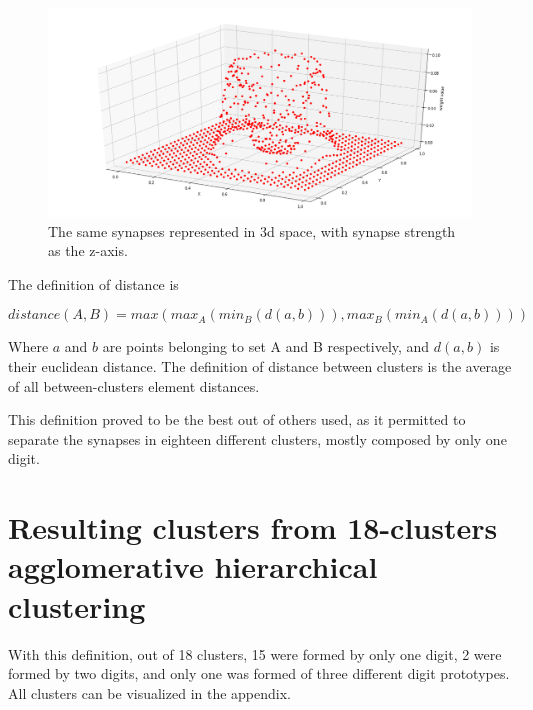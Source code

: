 \documentclass[a4paper]{report}
\begin{document}
\begin{figure} [H]
    \centering
    \includegraphics [width=12cm ] {o/zero_three.png}
    \caption{The same synapses represented in 3d space, with synapse strength as the z-axis.}
    \label{zero_three}
\end{figure}

The definition of distance is

\begin{equation}
    distance(A, B) = max(max_A(min_B(d(a,b))), max_B(min_A(d(a,b))))
\end{equation}

Where $a$ and $b$ are points belonging to set A and B respectively, and $d(a,b)$ is their euclidean distance.
The definition of distance between clusters is the average of all between-clusters element distances.

This definition proved to be the best out of others used, as it permitted to separate the synapses in eighteen different clusters, mostly composed by only one digit.



\section{Resulting clusters from 18-clusters agglomerative hierarchical clustering}

With this definition, out of 18 clusters, 15 were formed by only one digit, 2 were formed by two digits, and only one was formed of three different digit prototypes.
All clusters can be visualized in the appendix.
\end{document}
